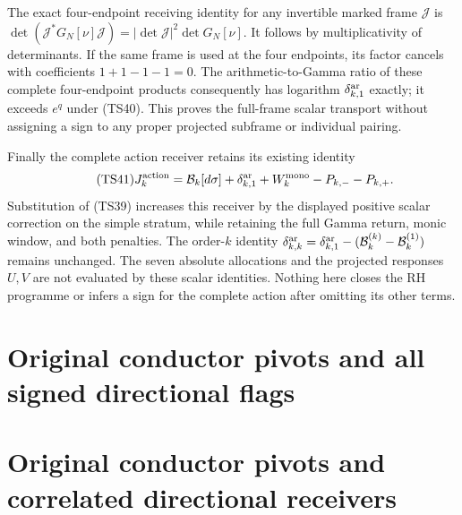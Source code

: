 \documentclass[11pt,a4paper]{article}
\begin{document}
The exact four-endpoint receiving identity for any invertible marked
frame $\mathcal J$ is
$\det(\mathcal J^*G_N[\nu]\mathcal J)=|\det\mathcal J|^2\det G_N[\nu]$.
It follows by multiplicativity of determinants. If the same frame is
used at the four endpoints, its factor cancels with coefficients
$1+1-1-1=0$. The arithmetic-to-Gamma ratio of these complete
four-endpoint products consequently has logarithm
$\delta_{k,1}^{\rm ar}$ exactly; it exceeds $e^q$ under (TS40).
This proves the full-frame scalar transport without assigning a
sign to any proper projected subframe or individual pairing.

Finally the complete action receiver retains its existing identity
\begin{equation}\tag{TS41}
 J_k^{\rm action}
 =\mathcal B_k[d\sigma]+\delta_{k,1}^{\rm ar}
   +W_k^{\rm mono}-P_{k,-}-P_{k,+}.
\end{equation}
Substitution of (TS39) increases this receiver by the displayed
positive scalar correction on the simple stratum, while retaining
the full Gamma return, monic window, and both penalties. The
order-$k$ identity
$\delta_{k,k}^{\rm ar}=\delta_{k,1}^{\rm ar}
 -(\mathcal B_k^{(k)}-\mathcal B_k^{(1)})$ remains unchanged.
The seven absolute allocations and the projected responses $U,V$
are not evaluated by these scalar identities. Nothing here closes
the RH programme or infers a sign for the complete action after
omitting its other terms.



\endgroup

\clearpage
\begingroup


\setcounter{equation}{0}
\renewcommand{\theequation}{A02CRP.\arabic{equation}}
\section*{Original conductor pivots and all signed directional flags}
\begingroup
\section{Original conductor pivots and correlated directional receivers}
\label{a02crp:sec:CRP}
\end{document}
